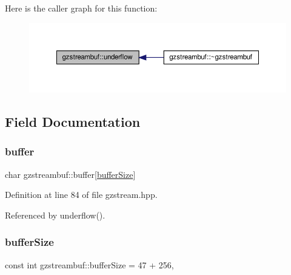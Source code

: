 Here is the caller graph for this function\+:
\nopagebreak
\begin{figure}[H]
\begin{center}
\leavevmode
\includegraphics[width=350pt]{d7/de3/classgzstreambuf_a83b34ca4fc77dcebfb5152bbbb6b5652_icgraph}
\end{center}
\end{figure}


\subsection{Field Documentation}
\mbox{\label{classgzstreambuf_afea1535417524acb188dc4390d918269}} 
\subsubsection{\texorpdfstring{buffer}{buffer}}
{\footnotesize\ttfamily char gzstreambuf\+::buffer\mbox{[}\hyperlink{classgzstreambuf_a46652e438b6c4e9174ca79c171b1a140}{buffer\+Size}\mbox{]}\hspace{0.3cm}{\ttfamily [private]}}



Definition at line 84 of file gzstream.\+hpp.



Referenced by underflow().

\mbox{\label{classgzstreambuf_a46652e438b6c4e9174ca79c171b1a140}} 
\subsubsection{\texorpdfstring{buffer\+Size}{bufferSize}}
{\footnotesize\ttfamily const int gzstreambuf\+::buffer\+Size = 47 + 256\hspace{0.3cm}{\ttfamily [static]}, {\ttfamily [private]}}



